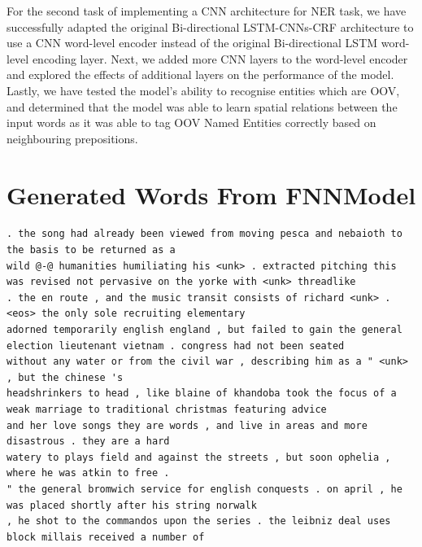\documentclass[sigconf,nonacm=true]{acmart}
\begin{document}
For the second task of implementing a CNN architecture for NER task, we have successfully adapted the original Bi-directional LSTM-CNNs-CRF architecture to use a CNN word-level encoder instead of the original Bi-directional LSTM
word-level encoding layer. Next, we added more CNN layers to the word-level encoder and explored the effects of additional layers on the performance of the model. Lastly, we have tested the model's ability to recognise entities which are OOV, and determined that the model was able to learn spatial relations between the input words as it was able to tag OOV Named Entities correctly based on neighbouring prepositions.



\newpage
\appendix
\section{Generated Words From FNNModel}
\label{appendix:generated}
\begin{minipage}{\linewidth}
\begin{lstlisting}
. the song had already been viewed from moving pesca and nebaioth to the basis to be returned as a
wild @-@ humanities humiliating his <unk> . extracted pitching this was revised not pervasive on the yorke with <unk> threadlike
. the en route , and the music transit consists of richard <unk> . <eos> the only sole recruiting elementary
adorned temporarily english england , but failed to gain the general election lieutenant vietnam . congress had not been seated
without any water or from the civil war , describing him as a " <unk> , but the chinese 's
headshrinkers to head , like blaine of khandoba took the focus of a weak marriage to traditional christmas featuring advice
and her love songs they are words , and live in areas and more disastrous . they are a hard
watery to plays field and against the streets , but soon ophelia , where he was atkin to free .
" the general bromwich service for english conquests . on april , he was placed shortly after his string norwalk
, he shot to the commandos upon the series . the leibniz deal uses block millais received a number of

\end{lstlisting}
\end{minipage}
\end{document}
